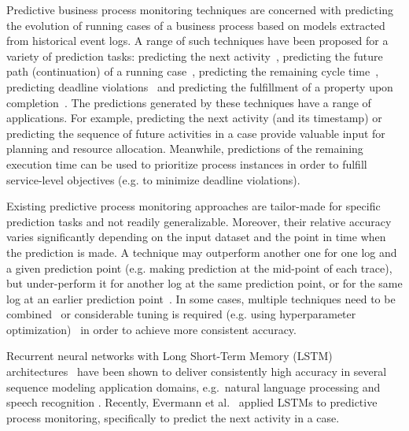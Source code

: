 \documentclass[runningheads,a4paper]{llncs}
\begin{document}
Predictive business process monitoring techniques are concerned with predicting the evolution of running cases of a business process based on models extracted from historical event logs. A range of such techniques have been proposed for a variety of prediction tasks: predicting the next activity~\cite{Becker2014}, predicting the future path (continuation) of a running case~\cite{Polato2016}, predicting the remaining cycle time~\cite{Rogge-Solti2013}, predicting deadline violations~\cite{MetzgerLISFCDP15} and predicting the fulfillment of a property upon completion~\cite{Maggi2014}.
The predictions generated by these techniques have a range of applications. For example, predicting the next activity (and its timestamp) or predicting the sequence of future activities in a case provide valuable input for planning and resource allocation. Meanwhile, predictions of the remaining execution time can be used to prioritize process instances in order to fulfill service-level objectives (e.g. to minimize deadline violations).



Existing predictive process monitoring approaches are tailor-made for specific prediction tasks and not readily generalizable. Moreover, their relative accuracy varies significantly depending on the input dataset and the point in time when the prediction is made. A technique may outperform another one for one log and a given prediction point (e.g. making prediction at the mid-point of each trace), but under-perform it for another log at the same prediction point, or for the same log at an earlier prediction point~\cite{Francescomarino15,MetzgerLISFCDP15}. In some cases, multiple techniques need to be combined~\cite{MetzgerLISFCDP15} or considerable tuning is required (e.g. using hyperparameter optimization)~\cite{Francescomarino16} in order to achieve more consistent accuracy.

Recurrent neural networks with Long Short-Term Memory (LSTM) architectures~\cite{Hochreiter1997} have been shown to deliver consistently high accuracy in several sequence modeling application domains, e.g.\ natural language processing \cite{Mikolov2013} and speech recognition \cite{Graves2013}. 
Recently, Evermann et al.~\cite{Evermann2016} applied LSTMs to predictive process monitoring, specifically to predict the next activity in a case.
\end{document}
